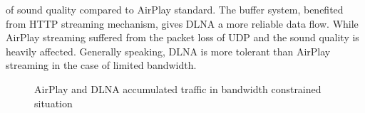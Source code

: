 of sound quality compared to AirPlay standard. The buffer system, benefited from HTTP streaming mechanism, gives DLNA a more reliable data flow. While AirPlay streaming suffered from the packet loss of UDP and the sound quality is heavily affected. Generally speaking, DLNA is more tolerant than AirPlay streaming in the case of limited bandwidth. \begin{figure}[hb]%
\caption{AirPlay and DLNA accumulated traffic in
bandwidth constrained situation\label{all_traffic_bw}}
\end{figure}
